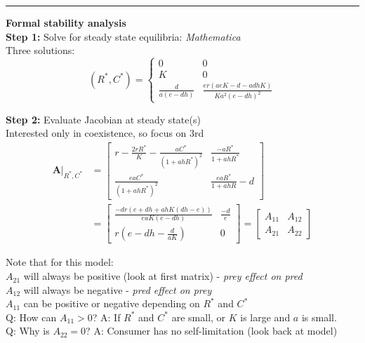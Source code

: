 \documentclass{article}
\newcommand{\note}[1]{\colorbox{gray!30}{#1}}
\newcommand{\ind}{\-\hspace{1cm}}
\begin{document}
\rule[0.5ex]{\linewidth}{1pt}

\pagebreak

\textbf{Formal stability analysis}\\
\textbf{Step 1:} Solve for steady state equilibria: \note{\emph{Mathematica}}\\
\ind Three solutions:
\begin{equation*}
	(R^*,C^*)=\begin{cases}
	0 & 0\\
	K & 0\\
	\frac{d}{a(e-dh)} & \frac{er(aeK-d-adhK)}{Ka^2(e-dh)^2}
	\end{cases}
\end{equation*}

\textbf{Step 2:} Evaluate Jacobian at steady state(s)\\
\ind Interested only in coexistence, so focus on 3rd
\begin{align*}
	\left.\mathbf{A}\right\vert_{R^*,C^*} 
	&= \begin{bmatrix}r-\frac{2rR^*}{K} - \frac{aC^*}{(1+ahR^*)^2} & \frac{-aR^*}{1+ahR^*}\\
				\frac{eaC^*}{(1+ahR^*)^2} & \frac{eaR^*}{1+ahR}-d \end{bmatrix}\\
	&=\begin{bmatrix} \frac{-dr(e+dh+ahK(dh-e))}{eaK(e-dh)} & \frac{-d}{e}\\
	r\left(e-dh-\frac{d}{aK}\right) & 0 \end{bmatrix}	
	=\begin{bmatrix} A_{11} & A_{12} \\ A_{21}& A_{22}	\end{bmatrix}	
\end{align*}

Note that for this model:\\
\ind $A_{21}$ will always be positive (look at first matrix) - \emph{prey effect on pred}\\
\ind $A_{12}$ will always be negative - \emph{pred effect on prey}\\
\ind $A_{11}$ can be positive or negative depending on $R^*$ and $C^*$\\
\note{Q:} How can $A_{11}>0$?  \note{A:} If $R^*$ and $C^*$ are small, or $K$ is large and $a$ is small.\\
\note{Q:} Why is $A_{22}=0$?  \note{A:} Consumer has no self-limitation (look back at model)\\
\end{document}
